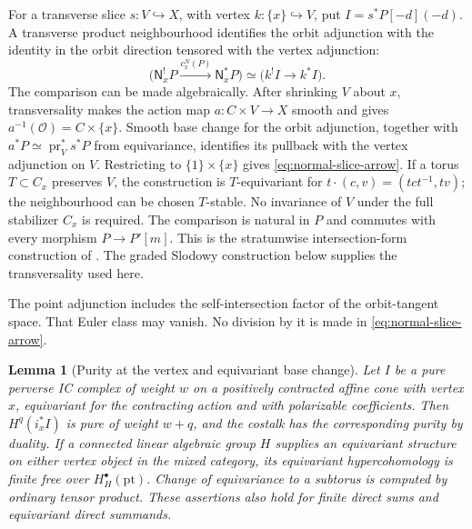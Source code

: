 \documentclass[10pt,a4paper]{amsart}
\newtheorem{lemma}[theorem]{Lemma}
\begin{document}
For a transverse slice $s:V\hookrightarrow X$, with vertex
$k:\{x\}\hookrightarrow V$, put $I=s^*P[-d](-d)$.
A transverse product neighbourhood identifies the orbit adjunction with
the identity in the orbit direction tensored with the vertex adjunction:
\begin{equation}\label{eq:normal-slice-arrow}
 \bigl(\mathsf N_x^!P\xrightarrow{c_x^N(P)}\mathsf N_x^*P\bigr)
 \simeq\bigl(k^!I\longrightarrow k^*I\bigr).
\end{equation}
The comparison can be made algebraically.  After shrinking $V$ about
$x$, transversality makes the action map
$a:C\times V\to X$ smooth and gives $a^{-1}(\mathcal O)=C\times\{x\}$.
Smooth base change for the orbit adjunction, together with
$a^*P\simeq\operatorname{pr}_V^*s^*P$ from equivariance, identifies its
pullback with the vertex adjunction on $V$.  Restricting to
$\{1\}\times\{x\}$ gives \eqref{eq:normal-slice-arrow}.
If a torus $T\subset C_x$ preserves $V$, the construction is
$T$-equivariant for $t\cdot(c,v)=(tct^{-1},tv)$; the neighbourhood can
be chosen $T$-stable.  No invariance of $V$ under the full stabilizer
$C_x$ is required.  The comparison is natural in $P$ and commutes
with every morphism $P\to P'[m]$.  This is the stratumwise
intersection-form construction of
\cite[Lemma~3.9 and Remark~3.12]{JMWParity}.
The graded Slodowy construction below supplies the transversality used here.

The point adjunction includes the self-intersection factor of the
orbit-tangent space.  That Euler class may vanish.  No division by it is
made in \eqref{eq:normal-slice-arrow}.

\begin{lemma}[Purity at the vertex and equivariant base change]
\label{lem:normal-purity-base-change}
Let $I$ be a pure perverse IC complex of weight $w$ on a positively
contracted affine cone with vertex $x$, equivariant for the contracting
action and with polarizable coefficients.
Then $H^q(i_x^*I)$ is pure of weight $w+q$, and the costalk has the
corresponding purity by duality.
If a connected linear algebraic group $H$ supplies an equivariant
structure on either vertex object in the mixed category, its
equivariant hypercohomology is finite free
over $H_H^\bullet(\mathrm{pt})$.  Change of equivariance to a subtorus
is computed by ordinary tensor product.  These assertions also hold for
finite direct sums and equivariant direct summands.
\end{lemma}
\end{document}
